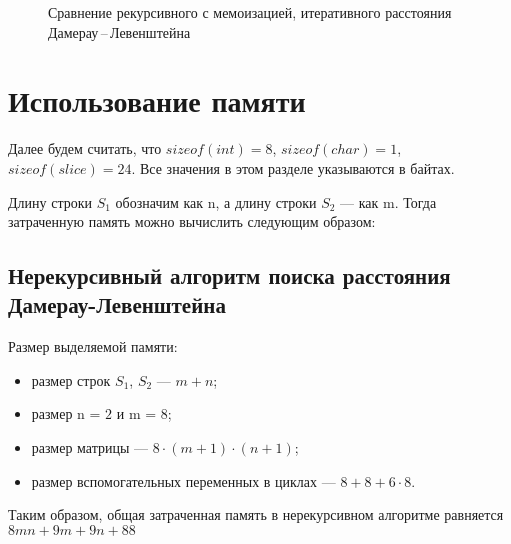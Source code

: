 \begin{figure}[ht!]
	\begin{center}
	\end{center}
	\caption{Сравнение рекурсивного с мемоизацией, итеративного расстояния Дамерау\,--\,Левенштейна}
\end{figure}



\section{Использование памяти}

Далее будем считать, что $sizeof(int) = 8$, $sizeof(char) = 1$, $sizeof(slice) = 24$. Все значения в этом разделе указываются в байтах.

Длину строки $S_1$ обозначим как n, а длину строки $S_2$ --- как m. Тогда затраченную память можно вычислить следующим образом:

\subsection{Нерекурсивный алгоритм поиска расстояния Дамерау-Левенштейна}
Размер выделяемой памяти:
\begin{itemize}
	\item размер строк $S_1$, $S_2$ --- $m + n$;
	\item размер n = $2$ и m = $8$;
	\item размер матрицы --- $8 \cdot (m + 1) \cdot (n + 1)$;
	\item размер вспомогательных переменных в циклах --- $8 + 8 + 6 \cdot 8$.
\end{itemize}
Таким образом, общая затраченная память в нерекурсивном алгоритме равняется $8mn + 9m + 9n + 88$


